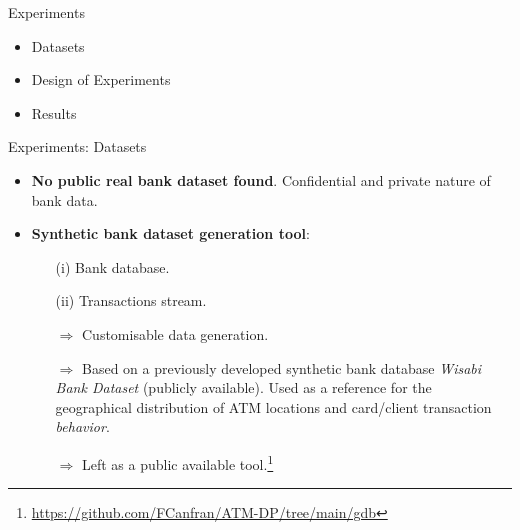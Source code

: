 
\begin{frame}{Experiments}
    \begin{itemize}
        \item Datasets
        \vspace{1em}
        \item Design of Experiments
        \vspace{1em}
        \item Results
    \end{itemize}
\end{frame}


\begin{frame}{Experiments: Datasets}
\begin{itemize}
    \item \textbf{No public real bank dataset found}. Confidential and private nature of bank data.
    \vspace{1em}
    \item \textbf{Synthetic bank dataset generation tool}: 
    \begin{itemize}
        \item[(i)] Bank database.
        \vspace{0.5em}
        \item[(ii)] Transactions stream.
    \end{itemize}
    \vspace{1em}
    \begin{itemize}
        \item[$\Rightarrow$] Customisable data generation.
        \vspace{0.5em}
        \item[$\Rightarrow$] Based on a previously developed synthetic bank database \emph{Wisabi Bank Dataset} (publicly available). Used as a reference for the geographical distribution of ATM locations and card/client transaction \emph{behavior}.
        \vspace{0.5em}
        \item[$\Rightarrow$] Left as a public available tool.\footnote{\url{https://github.com/FCanfran/ATM-DP/tree/main/gdb}}
    \end{itemize}    
\end{itemize}
\end{frame}

